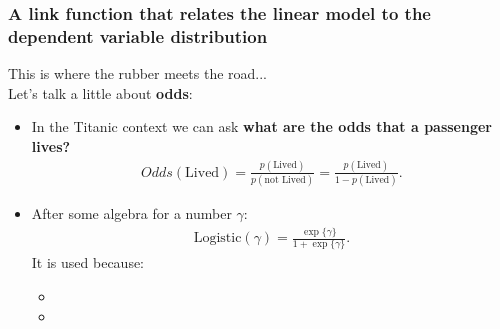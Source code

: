 \documentclass[aspectratio=169]{beamer}
\begin{document}
\begin{frame}
\frametitle{A link function that relates the linear model to the dependent variable distribution}

This is where the rubber meets the road...\\
\bigskip
Let's talk a little about \textbf{odds}:
\begin{itemize}
\item In the Titanic context we can ask \textbf{what are the odds that a passenger lives?}
\begin{align*}
Odds(\mbox{Lived}) = \frac{p(\mbox{Lived})}{p(\mbox{not Lived})} = \frac{p(\mbox{Lived})}{1 - p(\mbox{Lived})}.
\end{align*}
\item After some algebra for a number $\gamma$:
\begin{align*}
\mbox{Logistic}(\gamma) = \frac{\exp\{\gamma\}}{1 + \exp\{\gamma\}}.
\end{align*}
It is used because:
\begin{itemize}
\item[] %
\item[] %
\end{itemize}

\end{itemize}

\end{frame}
%
\end{document}
